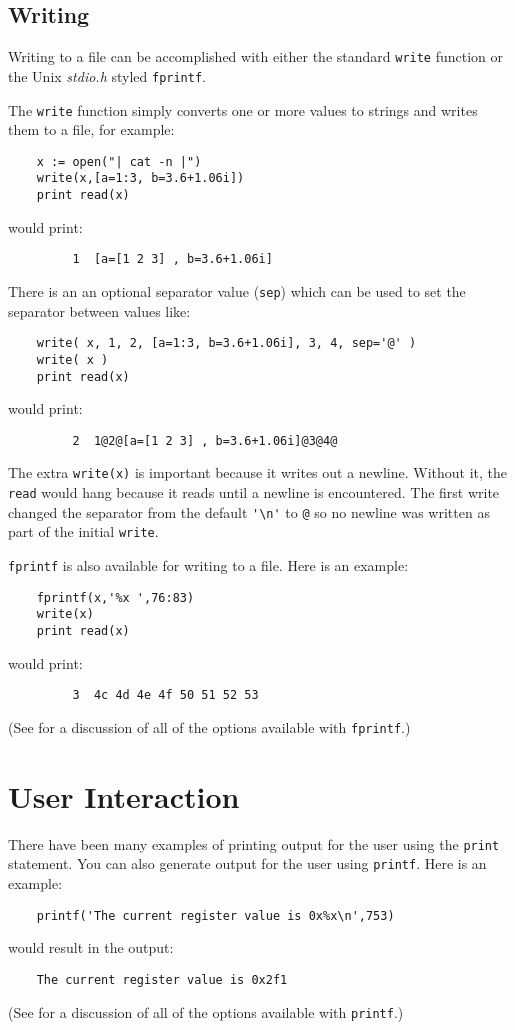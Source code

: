 \subsection{Writing}

Writing to a file can be accomplished with either the standard {\tt write} function or
the {\sc Unix} {\em stdio.h} styled {\tt fprintf}.

\label{write-func}
The {\tt write} function simply converts one or more values to strings and writes them
to a file, for example:
\begin{verbatim}
    x := open("| cat -n |")
    write(x,[a=1:3, b=3.6+1.06i])
    print read(x)
\end{verbatim}
would print:
\begin{verbatim}
         1  [a=[1 2 3] , b=3.6+1.06i]
\end{verbatim}
There is an an optional separator value ({\tt sep}) which can be used to set
the separator between values like:
\begin{verbatim}
    write( x, 1, 2, [a=1:3, b=3.6+1.06i], 3, 4, sep='@' )
    write( x )
    print read(x)
\end{verbatim}
would print:
\begin{verbatim}
         2  1@2@[a=[1 2 3] , b=3.6+1.06i]@3@4@
\end{verbatim}
The extra \verb+write(x)+ is important because it writes out a newline.
Without it, the {\tt read} would hang because it reads until a newline is
encountered. The first write changed the separator from the default
\verb+'\n'+ to \verb+@+ so no newline was written as part of the initial
{\tt write}.

\label{fprintf-func}
{\tt fprintf} is also available for writing to a file. Here is an example:
\begin{verbatim}
    fprintf(x,'%x ',76:83)
    write(x)
    print read(x)
\end{verbatim}
would print:
\begin{verbatim}
         3  4c 4d 4e 4f 50 51 52 53
\end{verbatim}
(See  for a discussion of all of the options available with
{\tt fprintf}.)

\section{User Interaction}

\label{printf-func}
There have been many examples of printing output for the user using the
{\tt print} statement. You can also generate output for the user using
{\tt printf}. Here is an example:
\begin{verbatim}
    printf('The current register value is 0x%x\n',753) 
\end{verbatim}
would result in the output:
\begin{verbatim}
    The current register value is 0x2f1
\end{verbatim}
(See  for a discussion of all of the options available with
{\tt printf}.)


